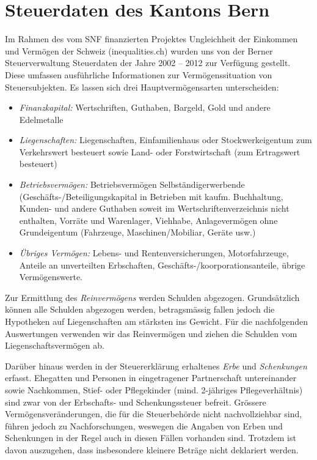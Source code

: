 \documentclass[a4paper, 12pt,liststotoc]{scrartcl}
\numberwithin{equation}{section}
\begin{document}
\section{Steuerdaten des Kantons
Bern}\label{steuerdaten-des-kantons-bern}

Im Rahmen des vom SNF finanzierten Projektes Ungleichheit der Einkommen
und Vermögen der Schweiz (inequalities.ch) wurden uns von der Berner
Steuerverwaltung Steuerdaten der Jahre 2002 -- 2012 zur Verfügung
gestellt. Diese umfassen ausführliche Informationen zur
Vermögenssituation von Steuersubjekten. Es lassen sich drei
Hauptvermögensarten unterscheiden:

\begin{itemize}
\item
  \emph{Finanzkapital:} Wertschriften, Guthaben, Bargeld, Gold und
  andere Edelmetalle
\item
  \emph{Liegenschaften:} Liegenschaften, Einfamilienhaus oder
  Stockwerkeigentum zum Verkehrswert besteuert sowie Land- oder
  Forstwirtschaft (zum Ertragswert besteuert)
\item
  \emph{Betriebsvermögen:} Betriebsvermögen Selbständigerwerbende
  (Geschäfts-/Be\-tei\-li\-gungs\-ka\-pi\-tal in Betrieben mit kaufm. Buchhaltung,
  Kunden- und andere Guthaben soweit im Wertschriftenverzeichnis nicht
  enthalten, Vorräte und Warenlager, Viehhabe, Anlagevermögen ohne
  Grundeigentum (Fahrzeuge, Maschinen/Mobiliar, Geräte usw.)
\item
  \emph{Übriges Vermögen:} Lebens- und Rentenversicherungen,
  Motorfahrzeuge, Anteile an unverteilten Erbschaften,
  Geschäfts-/koorporationsanteile, übrige Vermögenswerte.
\end{itemize}

Zur Ermittlung des \emph{Reinvermögens} werden Schulden abgezogen.
Grundsätzlich können alle Schulden abgezogen werden, betragsmässig
fallen jedoch die Hypotheken auf Liegenschaften am stärksten ins
Gewicht. Für die nachfolgenden Auswertungen verwenden wir das
Reinvermögen und ziehen die Schulden vom Liegenschaftsvermögen ab.

Darüber hinaus werden in der Steuererklärung erhaltenes \emph{Erbe} und
\emph{Schenkungen} erfasst. Ehegatten und Personen in eingetragener
Partnerschaft untereinander sowie Nachkommen, Stief- oder Pflegekinder
(mind. 2-jähriges Pflegeverhältnis) sind zwar von der Erbschafts- und
Schenkungssteuer befreit. Grössere Vermögensveränderungen, die für die
Steuerbehörde nicht nachvollziehbar sind, führen jedoch zu
Nachforschungen, weswegen die Angaben von Erben und Schenkungen in der
Regel auch in diesen Fällen vorhanden sind. Trotzdem ist davon
auszugehen, dass insbesondere kleinere Beträge nicht deklariert werden.
\end{document}
